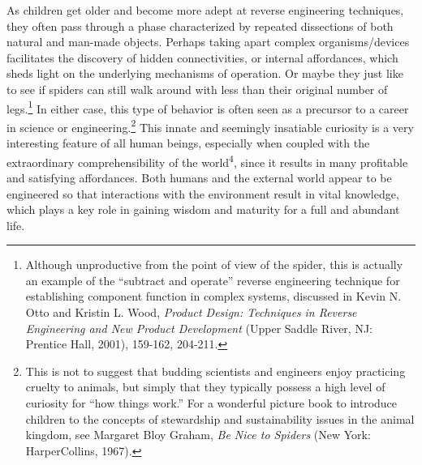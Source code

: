 As children get older and become more adept at reverse engineering
techniques, they often pass through a phase characterized by repeated
dissections of both natural and man-made objects. Perhaps taking apart
complex organisms/devices facilitates the discovery of hidden
connectivities, or internal affordances, which sheds light on the
underlying mechanisms of operation. Or maybe they just like to see if
spiders can still walk around with less than their original number of
legs.\footnote{Although unproductive from the point of view of the
spider, this is actually an example of the “subtract and operate”
reverse engineering technique for establishing component function in
complex systems, discussed in Kevin N. Otto and Kristin L. Wood,
\textit{Product Design: Techniques }\textit{in Reverse Engineering and
New Product Development} (Upper Saddle River, NJ: Prentice Hall, 2001),
159-162, 204-211.}
In either case, this type of behavior is often
seen as a precursor to a career in science or
engineering.\footnote{
This is not to suggest that budding scientists and
engineers enjoy practicing cruelty to animals, but simply that they
typically possess a high level of curiosity for “how things work.” For
a wonderful picture book to introduce children to the concepts of
stewardship and sustainability issues in the animal kingdom, see
Margaret Bloy Graham, \textit{Be Nice to Spiders} (New York:
HarperCollins, 1967).
}
This innate and seemingly insatiable
curiosity is a very interesting feature of all human beings, especially
when coupled with the extraordinary comprehensibility of the
world\textsuperscript{4}, since it results in many profitable and
satisfying affordances. Both humans and the external world appear to be
engineered so that interactions with the environment result in vital
knowledge, which plays a key role in gaining wisdom and maturity for a
full and abundant life.


